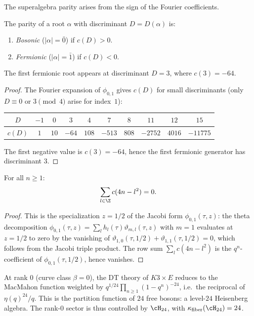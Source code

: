\begin{remark}
\end{remark}

The superalgebra parity arises from the sign of the Fourier coefficients.

\begin{proposition}
\label{prop:k3e-super-grading}
The parity of a root $\alpha$ with discriminant $D = D(\alpha)$ is:
\begin{enumerate}[label=(\roman*)]
 \item \emph{Bosonic} ($|\alpha| = \bar{0}$) if $c(D) > 0$.
 \item \emph{Fermionic} ($|\alpha| = \bar{1}$) if $c(D) < 0$.
\end{enumerate}
The first fermionic root appears at discriminant $D = 3$, where $c(3) = -64$.
\end{proposition}

\begin{proof}
The Fourier expansion of $\phi_{0,1}$ gives $c(D)$ for small discriminants
(only $D \equiv 0$ or $3 \pmod{4}$ arise for index~$1$):
\begin{center}
\begin{tabular}{c|ccccccccc}
$D$ & $-1$ & $0$ & $3$ & $4$ & $7$ & $8$ & $11$ & $12$ & $15$ \\ \hline
$c(D)$ & $1$ & $10$ & $-64$ & $108$ & $-513$ & $808$ & $-2752$ & $4016$ & $-11775$
\end{tabular}
\end{center}
The first negative value is $c(3) = -64$, hence the first fermionic generator has discriminant $3$.
\end{proof}

\begin{proposition}
\label{prop:k3e-row-sum}
For all $n \geq 1$:
\[
 \sum_{l \in \Z} c(4n - l^2) = 0.
\]
\end{proposition}

\begin{proof}
This is the specialization $z = 1/2$ of the Jacobi form $\phi_{0,1}(\tau, z)$: the theta decomposition $\phi_{0,1}(\tau,z) = \sum_l h_l(\tau) \vartheta_{m,l}(\tau,z)$ with $m=1$ evaluates at $z = 1/2$ to zero by the vanishing of $\vartheta_{1,0}(\tau, 1/2) + \vartheta_{1,1}(\tau, 1/2) = 0$, which follows from the Jacobi triple product. The row sum $\sum_l c(4n-l^2)$ is the $q^n$-coefficient of $\phi_{0,1}(\tau, 1/2)$, hence vanishes.
\end{proof}

\begin{remark}
\label{rem:k3e-rank0}
At rank $0$ (curve class $\beta = 0$), the DT theory of $K3 \times E$ reduces to the MacMahon function weighted by $q^{1/24} \prod_{n \geq 1}(1 - q^n)^{-24}$, i.e.\ the reciprocal of $\eta(q)^{24} / q$. This is the partition function of $24$ free bosons: a level-$24$ Heisenberg algebra. The rank-$0$ sector is thus controlled by $\cH_{24}$, with $\kappa_{\mathrm{fiber}}(\cH_{24}) = 24$.
\end{remark}

